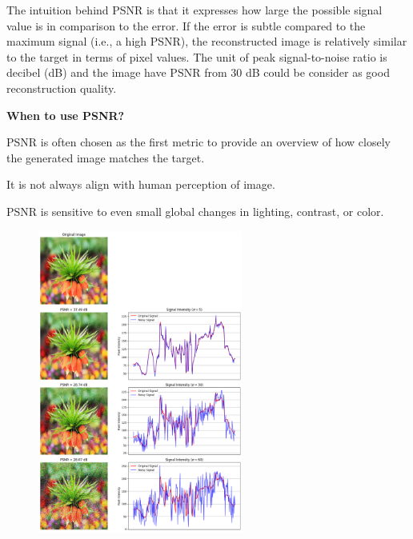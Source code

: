 \vspace{-10pt}

The intuition behind PSNR is that it expresses how large the possible signal value is in comparison to the error. 
If the error is subtle compared to the maximum signal (i.e., a high PSNR), the reconstructed image is relatively similar to the target in terms of pixel values.
The unit of peak signal-to-noise ratio is decibel (dB) and the image have PSNR from 30 dB could be consider as good reconstruction quality.



\textbf{When to use PSNR?}

PSNR is often chosen as the first metric to provide an overview of how closely the generated image matches the target.

{
\item It is not always align with human perception of image.
\item PSNR is sensitive to even small global changes in lighting, contrast, or color.
}

\clearpage

\thispagestyle{customstyle}


\begin{figure}[ht!]
    \centering
    \includegraphics[width=0.6\textwidth]{figures/PSNR_plot.png}
    \label{PSNR plot}
\end{figure}


